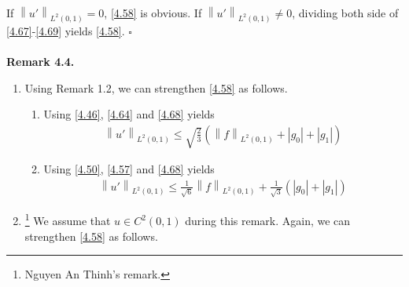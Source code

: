 \documentclass[a4paper]{article}
\numberwithin{equation}{section}
\begin{document}
If ${\left\| {u'} \right\|_{{L^2}\left( {0,1} \right)}}=0$, \eqref{4.58} is obvious. If ${\left\| {u'} \right\|_{{L^2}\left( {0,1} \right)}}\ne 0$, dividing both side of \eqref{4.67}-\eqref{4.69} yields \eqref{4.58}. \hfill $\square$\\
\\
\textbf{Remark 4.4.} 
\begin{enumerate}
\item Using Remark 1.2, we can strengthen \eqref{4.58} as follows.
\begin{enumerate}
\item Using \eqref{4.46}, \eqref{4.64} and \eqref{4.68} yields
\begin{align}
{\left\| {u'} \right\|_{{L^2}\left( {0,1} \right)}} \le \sqrt {\frac{2}{3}} \left( {{{\left\| f \right\|}_{{L^2}\left( {0,1} \right)}} + \left| {{g_0}} \right| + \left| {{g_1}} \right|} \right)
\end{align}
\item Using \eqref{4.50}, \eqref{4.57} and \eqref{4.68} yields
\begin{align}
{\left\| {u'} \right\|_{{L^2}\left( {0,1} \right)}} \le \frac{1}{{\sqrt 6 }}{\left\| f \right\|_{{L^2}\left( {0,1} \right)}} + \frac{1}{{\sqrt 3 }}\left( {\left| {{g_0}} \right| + \left| {{g_1}} \right|} \right)
\end{align}
\end{enumerate}
\item \footnote{Nguyen An Thinh's remark.} We assume that $u\in C^2\left(0,1\right)$ during this remark. Again, we can strengthen \eqref{4.58} as follows.


\end{enumerate}
\end{document}
